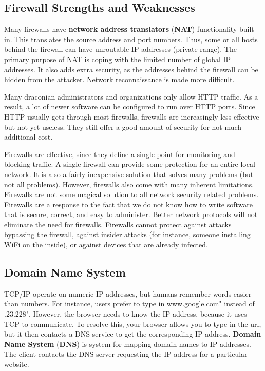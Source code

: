 \documentclass[11pt]{article}
\theoremstyle{plain} %
\theoremstyle{definition}
\theoremstyle{example}
\theoremstyle{remark}
\def\url#1{\expandafter\string\csname #1\endcsname}
\begin{document}
\subsection{Firewall Strengths and Weaknesses}
Many firewalls have \textbf{network address translators} (\textbf{NAT}) functionality built in. This translates the source address and port numbers. Thus, some or all hosts behind the firewall can have unroutable IP addresses (private range). The primary purpose of NAT is coping with the limited number of global IP addresses. It also adds extra security, as the addresses behind the firewall can be hidden from the attacker. Network reconnaissance is made more difficult. 

Many draconian administrators and organizations only allow HTTP traffic. As a result, a lot of newer software can be configured to run over HTTP ports. Since HTTP usually gets through most firewalls, firewalls are increasingly less effective
but not yet useless. They still offer a good amount of security for not much additional cost. 

Firewalls are effective, since they define a single point for monitoring and blocking traffic. A single firewall can provide some protection for an entire local network. It is also a fairly inexpensive solution that solves many problems (but not all problems). However, firewalls also come with many inherent limitations. Firewalls are not some magical solution to all network security related problems. Firewalls are a response to the fact that we do not know how to write software that is secure, correct, and easy to administer. Better network protocols will not eliminate the need for firewalls. Firewalls cannot protect against attacks bypassing the firewall, against insider attacks (for instance, someone installing WiFi on the inside), or against devices that are already infected. 

\subsection{Domain Name System}
TCP/IP operate on numeric IP addresses, but humans remember words easier than numbers. For instance, users prefer to type in \url{www.google.com}" instead of \url{172.217.23.228}". However, the browser needs to know the IP address, because it uses TCP to communicate. To resolve this, your browser allows you to type in the url, but it then contacts a DNS service to get the corresponding IP address. \textbf{Domain Name System} (\textbf{DNS}) is system for mapping domain names to IP addresses. The client contacts the DNS server requesting the IP address for a particular website.
\end{document}

